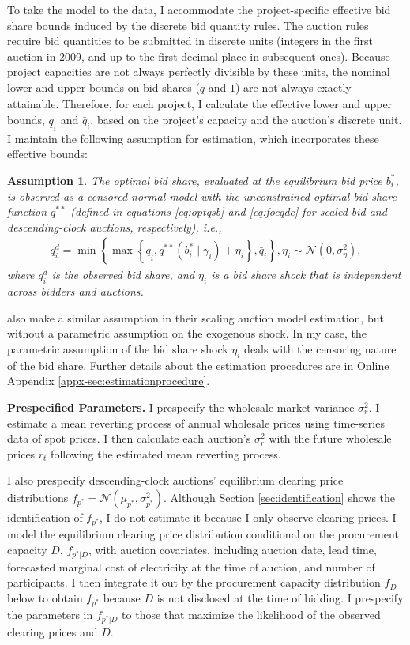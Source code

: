 \documentclass[12pt]{article}
\newtheorem{assumption}{Assumption}
\theoremstyle{definition} %
\begin{document}
To take the model to the data, I accommodate the project-specific effective bid share bounds induced by the discrete bid quantity rules. The auction rules require bid quantities to be submitted in discrete units (integers in the first auction in 2009, and up to the first decimal place in subsequent ones). Because project capacities are not always perfectly divisible by these units, the nominal lower and upper bounds on bid shares ($\underline{q}$ and $1$) are not always exactly attainable. Therefore, for each project, I calculate the effective lower and upper bounds, $\underline{q}_i$ and $\bar{q}_i$, based on the project's capacity and the auction's discrete unit. I maintain the following assumption for estimation, which incorporates these effective bounds:
\begin{assumption}
\label{assu:obsq}
The optimal bid share, evaluated at the equilibrium bid price $b_i^\ast $, is observed as a censored normal model with the unconstrained optimal bid share function $q^{\ast\ast}$ (defined in equations \eqref{eq:optqsb} and \eqref{eq:focqdc} for sealed-bid and descending-clock auctions, respectively), i.e.,
\begin{align*}
q_i^d = \min \left\{\max \left\{\underline{q}_i, q^{\ast\ast}(b_i^\ast \mid \gamma_i) + \eta_i \right\}, \bar{q}_i \right\}, \eta_i \sim \mathcal{N}(0,\sigma_\eta^2),
\end{align*}
where $q_i^d$ is the observed bid share, and $\eta_i $ is a bid share shock that is independent across bidders and auctions.
\end{assumption}
\citet{Bolotnyy2023} also make a similar assumption in their scaling auction model estimation, but without a parametric assumption on the exogenous shock. In my case, the parametric assumption of the bid share shock $\eta_i $ deals with the censoring nature of the bid share. Further details about the estimation procedures are in Online Appendix \ref{appx-sec:estimationprocedure}.

\textbf{Prespecified Parameters.} I prespecify the wholesale market variance $\sigma_r^2 $. I estimate a mean reverting process of annual wholesale prices using time-series data of spot prices. I then calculate each auction's $\sigma_r^2 $ with the future wholesale prices $r_t $ following the estimated mean reverting process.

I also prespecify descending-clock auctions' equilibrium clearing price distributions $f_{p^\ast} = \mathcal{N}(\mu_{p^\ast},\sigma_{p^\ast}^2) $. Although Section \ref{sec:identification} shows the identification of $f_{p^\ast}$, I do not estimate it because I only observe  clearing prices. I model the equilibrium clearing price distribution conditional on the procurement capacity $D$, $f_{p^\ast|D} $, with auction covariates, including auction date, lead time, forecasted marginal cost of electricity at the time of auction, and number of participants. I then integrate it out by the procurement capacity distribution $f_D $ below to obtain $f_{p^\ast} $ because $D$ is not disclosed at the time of bidding. I prespecify the parameters in $f_{p^\ast|D} $ to those that maximize the likelihood of the observed clearing prices and $D$.
\end{document}
